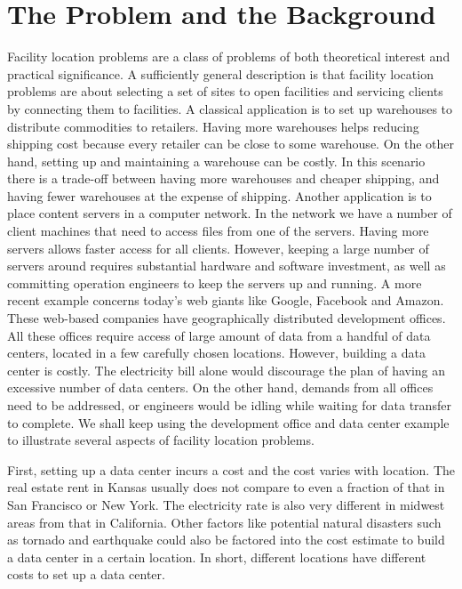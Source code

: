 \documentclass[oneside,final]{ucr}
\begin{document}
\section{The Problem and the Background}
Facility location problems are a class of problems of both
theoretical interest and practical significance. A
sufficiently general description is that facility location
problems are about selecting a set of sites to open
facilities and servicing clients by connecting them to
facilities. A classical application is to set up warehouses
to distribute commodities to retailers.  Having more
warehouses helps reducing shipping cost because every
retailer can be close to some warehouse. On the other hand,
setting up and maintaining a warehouse can be costly. In
this scenario there is a trade-off between having more
warehouses and cheaper shipping, and having fewer warehouses
at the expense of shipping. Another application is to
place content servers in a computer network. In the network
we have a number of client machines that need to access
files from one of the servers. Having more servers allows
faster access for all clients. However, keeping a large
number of servers around requires substantial hardware and
software investment, as well as committing operation
engineers to keep the servers up and running. A more recent
example concerns today's web giants like Google, Facebook
and Amazon. These web-based companies have geographically
distributed development offices. All these offices require
access of large amount of data from a handful of data
centers, located in a few carefully chosen
locations. However, building a data center is costly. The
electricity bill alone would discourage the plan of having
an excessive number of data centers. On the other hand,
demands from all offices need to be addressed, or engineers
would be idling while waiting for data transfer to
complete. We shall keep using the development office and
data center example to illustrate several aspects of
facility location problems.

First, setting up a data center incurs a cost and the cost
varies with location. The real estate rent in Kansas usually
does not compare to even a fraction of that in San Francisco
or New York. The electricity rate is also very different in
midwest areas from that in California. Other factors like
potential natural disasters such as tornado and earthquake
could also be factored into the cost estimate to build a
data center in a certain location. In short, different
locations have different costs to set up a data center.
\end{document}

